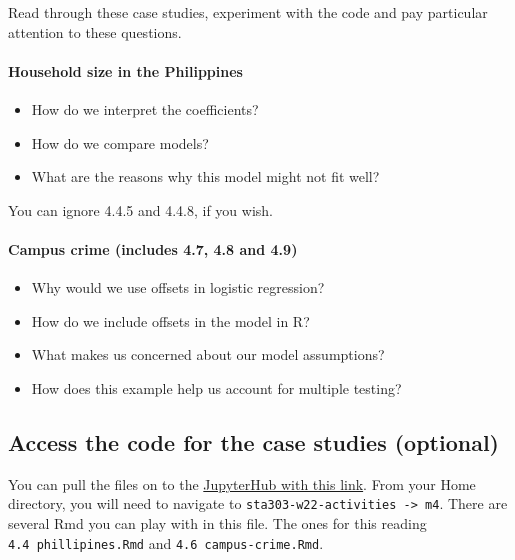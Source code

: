 \documentclass[
  openany]{book}
\providecommand{\tightlist}{%
  \setlength{\itemsep}{0pt}\setlength{\parskip}{0pt}}
\begin{document}
Read through these case studies, experiment with the code and pay
particular attention to these questions.

\hypertarget{household-size-in-the-philippines}{%
\paragraph{Household size in the Philippines}\label{household-size-in-the-philippines}}

\begin{itemize}
\tightlist
\item
  How do we interpret the coefficients?
\item
  How do we compare models?
\item
  What are the reasons why this model might not fit well?
\end{itemize}

You can ignore 4.4.5 and 4.4.8, if you wish.

\hypertarget{campus-crime-includes-4.7-4.8-and-4.9}{%
\paragraph{Campus crime (includes 4.7, 4.8 and 4.9)}\label{campus-crime-includes-4.7-4.8-and-4.9}}

\begin{itemize}
\tightlist
\item
  Why would we use offsets in logistic regression?
\item
  How do we include offsets in the model in R?
\item
  What makes us concerned about our model assumptions?
\item
  How does this example help us account for multiple testing?
\end{itemize}

\hypertarget{access-the-code-for-the-case-studies-optional}{%
\subsection{Access the code for the case studies (optional)}\label{access-the-code-for-the-case-studies-optional}}

You can pull the files on to the \href{https://jupyter.utoronto.ca/hub/user-redirect/git-pull?repo=https\%3A\%2F\%2Fgithub.com\%2Fsta303-bolton\%2Fsta303-w22-activities\&urlpath=rstudio\%2F}{JupyterHub with this
link}.
From your Home directory, you will need to navigate to
\texttt{sta303-w22-activities\ -\textgreater{}\ m4}. There are several Rmd you can play with
in this file. The ones for this reading \texttt{4.4\ phillipines.Rmd} and
\texttt{4.6\ campus-crime.Rmd}.
\end{document}
